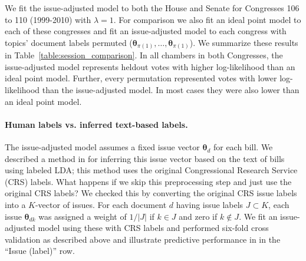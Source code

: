 We fit the issue-adjusted model to both the House and Senate for
Congresses 106 to 110 (1999-2010) with $\lambda=1$. For comparison we
also fit an ideal point model to each of these congresses and fit an
issue-adjusted model to each congress with topics' document labels
permuted ($\bm \theta_{\pi(1)}, \ldots, \bm \theta_{\pi(1)}$). We
summarize these results in Table~\ref{table:session_comparison}. In
all chambers in both Congresses, the issue-adjusted model represents
heldout votes with higher log-likelihood than an ideal point model.
Further, every permutation represented votes with lower log-likelihood
than the issue-adjusted model.  In most cases they were also lower
than an ideal point model.


\paragraph{Human labels vs. inferred text-based labels.}
The issue-adjusted model assumes a fixed issue vector $\bm \theta_d$
for each bill.  We described a method in  for inferring
this issue vector based on the text of bills using labeled LDA; this
method uses the original Congressional Research Service (CRS) labels.
What happens if we skip this preprocessing step and just use the
original CRS labels? We checked this by converting the original CRS
issue labels into a $K$-vector of issues.  For each document $d$
having issue labels $J \subset K$, each issue $\bm \theta_{dk}$ was
assigned a weight of $1 / |J|$ if $k \in J$ and zero if $k \not \in
J$. We fit an issue-adjusted model using these with CRS labels and
performed six-fold cross validation as described above and illustrate
predictive performance in  in the ``Issue
(label)'' row.

